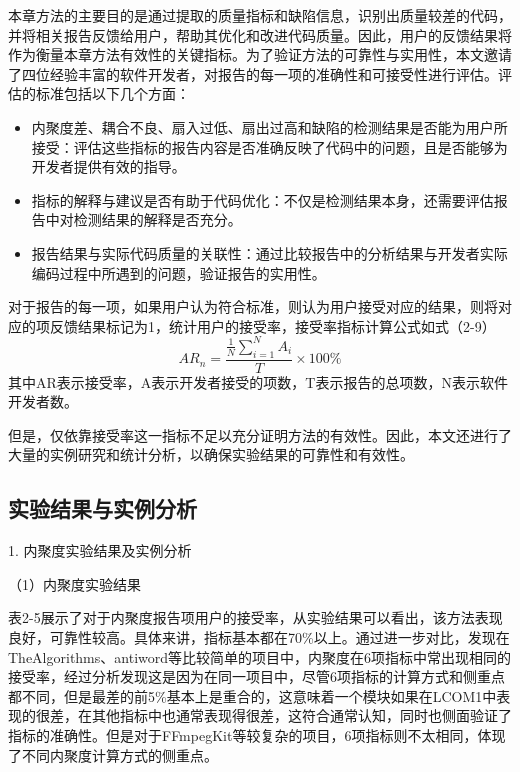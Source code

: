 本章方法的主要目的是通过提取的质量指标和缺陷信息，识别出质量较差的代码，并将相关报告反馈给用户，帮助其优化和改进代码质量。因此，用户的反馈结果将作为衡量本章方法有效性的关键指标。为了验证方法的可靠性与实用性，本文邀请了四位经验丰富的软件开发者，对报告的每一项的准确性和可接受性进行评估。评估的标准包括以下几个方面：

\begin{itemize}
    \item 内聚度差、耦合不良、扇入过低、扇出过高和缺陷的检测结果是否能为用户所接受：评估这些指标的报告内容是否准确反映了代码中的问题，且是否能够为开发者提供有效的指导。
    \item 指标的解释与建议是否有助于代码优化：不仅是检测结果本身，还需要评估报告中对检测结果的解释是否充分。
    \item 报告结果与实际代码质量的关联性：通过比较报告中的分析结果与开发者实际编码过程中所遇到的问题，验证报告的实用性。
\end{itemize}

对于报告的每一项，如果用户认为符合标准，则认为用户接受对应的结果，则将对应的项反馈结果标记为1，统计用户的接受率，接受率指标计算公式如式（2-9）
\begin{equation}
    AR_n =  \frac{\frac{1}{N} \sum_{i=1}^{N} A_i}{T} \times 100\%
    \end{equation}
其中AR表示接受率，A表示开发者接受的项数，T表示报告的总项数，N表示软件开发者数。

但是，仅依靠接受率这一指标不足以充分证明方法的有效性。因此，本文还进行了大量的实例研究和统计分析，以确保实验结果的可靠性和有效性。

\subsection{实验结果与实例分析}
1. 内聚度实验结果及实例分析

（1）内聚度实验结果

表2-5展示了对于内聚度报告项用户的接受率，从实验结果可以看出，该方法表现良好，可靠性较高。具体来讲，指标基本都在70\%以上。通过进一步对比，发现在TheAlgorithms、antiword等比较简单的项目中，内聚度在6项指标中常出现相同的接受率，经过分析发现这是因为在同一项目中，尽管6项指标的计算方式和侧重点都不同，但是最差的前5\%基本上是重合的，这意味着一个模块如果在LCOM1中表现的很差，在其他指标中也通常表现得很差，这符合通常认知，同时也侧面验证了指标的准确性。但是对于FFmpegKit等较复杂的项目，6项指标则不太相同，体现了不同内聚度计算方式的侧重点。

